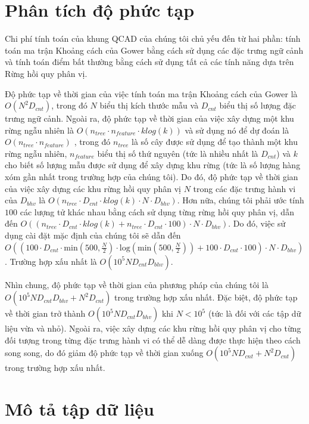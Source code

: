 \section{Phân tích độ phức tạp}\label{Appendix:Complexity}
Chi phí tính toán của khung QCAD của chúng tôi chủ yếu đến từ hai phần: tính toán ma trận Khoảng cách của Gower bằng cách sử dụng các đặc trưng ngữ cảnh và tính toán điểm bất thường bằng cách sử dụng tất cả các tính năng dựa trên Rừng hồi quy phân vị.

Độ phức tạp về thời gian của việc tính toán ma trận Khoảng cách của Gower là $O(N^{2}D_{cnt})$, trong đó $N$ biểu thị kích thước mẫu và $D_{cnt}$ biểu thị số lượng đặc trưng ngữ cảnh. Ngoài ra, độ phức tạp về thời gian của việc xây dựng một khu rừng ngẫu nhiên là $O( n_{tree}\cdot n_{feature} \cdot k log(k))$ và sử dụng nó để dự đoán là $O( n_{tree}\cdot n_{feature})$ \citep{buczak2015survey}, trong đó $n_{tree}$ là số cây được sử dụng để tạo thành một khu rừng ngẫu nhiên, $n_{feature}$ biểu thị số thứ nguyên (tức là nhiều nhất là $D_{cnt}$) và $k$ cho biết số lượng mẫu được sử dụng để xây dựng khu rừng (tức là số lượng hàng xóm gần nhất trong trường hợp của chúng tôi). Do đó, độ phức tạp về thời gian của việc xây dựng các khu rừng hồi quy phân vị $N$ trong các đặc trưng hành vi của $D_{bhv}$ là $O( n_{tree}\cdot D_{cnt} \cdot k log(k) \cdot N \cdot D_{bhv} )$.
Hơn nữa, chúng tôi phải ước tính $100$ các lượng tử khác nhau bằng cách sử dụng từng rừng hồi quy phân vị, dẫn đến $O( (n_{tree} \cdot D_{cnt} \cdot k log(k)+ n_{tree} \cdot D_{cnt} \cdot 100) \cdot N \cdot D_{bhv} )$. Do đó, việc sử dụng cài đặt mặc định của chúng tôi sẽ dẫn đến $O( ( 100 \cdot D_{cnt} \cdot \mathrm{min}(500,\frac{N}{2})\cdot \mathrm{log}(\mathrm{min}(500,\frac{N}{2})) + 100 \cdot D_{cnt} \cdot 100) \cdot N \cdot D_{bhv})$. Trường hợp xấu nhất là $O(10^{5}N D_{cnt}D_{bhv}).$

Nhìn chung, độ phức tạp về thời gian của phương pháp của chúng tôi là $O(10^{5}N D_{cnt}D_{bhv}+N^{2}D_{cnt})$ trong trường hợp xấu nhất. Đặc biệt, độ phức tạp về thời gian trở thành $O(10^{5}N D_{cnt}D_{bhv})$ khi $N<10^{5}$ (tức là đối với các tập dữ liệu vừa và nhỏ). Ngoài ra, việc xây dựng các khu rừng hồi quy phân vị cho từng đối tượng trong từng đặc trưng hành vi có thể dễ dàng được thực hiện theo cách song song, do đó giảm độ phức tạp về thời gian xuống $O(10^{5}N D_{cnt}+N^{2}D_{cnt})$ trong trường hợp xấu nhất.

\section{Mô tả tập dữ liệu}\label{Appendix:Data}

